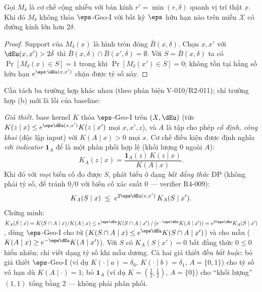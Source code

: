 \begin{menhde}
\label{prop:cap}
Gọi $M_\delta$ là cơ chế cộng nhiễu với bán kính $r' = \min(r, \delta)$ quanh vị
trí thật $x$. Khi đó $M_\delta$ không thỏa $\eps$-Geo-I với bất kỳ $\eps$ hữu hạn
nào trên miền $\mathcal{X}$ có đường kính lớn hơn $2\delta$.
\end{menhde}

\begin{proof}
Support của $M_\delta(x)$ là hình tròn đóng $\bar{B}(x, \delta)$. Chọn $x, x'$
với $\dEu(x, x') > 2\delta$ thì $\bar{B}(x,\delta) \cap \bar{B}(x',\delta) =
\emptyset$. Với $S = \bar{B}(x, \delta)$ ta có $\Pr[M_\delta(x) \in S] = 1$
trong khi $\Pr[M_\delta(x') \in S] = 0$; không tồn tại hằng số hữu hạn
$e^{\eps\, \dEu(x,x')}$ chặn được tỷ số này.
\end{proof}

Cần tách ba trường hợp khác nhau (theo phản biện V-010/R2-011); chỉ trường hợp
(b) mới là lỗi của baseline:

\begin{menhde}
\label{prop:fixedaccept}
\emph{Giả thiết.} base kernel $K$ thỏa $\eps$-Geo-I trên $(X,\dEu)$ (tức
$K(z\mid x)\le e^{\eps\dEu(x,x')}K(z\mid x')$ mọi $x,x',z$), và $A$ là tập cho
phép \emph{cố định, công khai} (độc lập input) với $K(A\mid x)>0$ mọi $x$.
Cơ chế điều kiện được định nghĩa \emph{với indicator} $\mathbf 1_A$ để là một
phân phối hợp lệ (khối lượng $0$ ngoài $A$):
\[
K_A(z\mid x)=\frac{\mathbf 1_A(z)\,K(z\mid x)}{K(A\mid x)} .
\]
Khi đó với \emph{mọi} biến cố đo được $S$, phát biểu ở dạng \emph{bất đẳng thức}
DP (không phải tỷ số, để tránh $0/0$ với biến cố xác suất 0 --- verifier R4-009):
\[
K_A(S\mid x)\;\le\;e^{2\eps \dEu(x,x')}\,K_A(S\mid x').
\]
Chứng minh: $K_A(S\mid x)=K(S\cap A\mid x)/K(A\mid x)
\le e^{\eps \dEu}K(S\cap A\mid x')\,/\,(e^{-\eps \dEu}K(A\mid x'))
=e^{2\eps \dEu}K_A(S\mid x')$, dùng $\eps$-Geo-I cho tử ($K(S\cap A\mid x)\le
e^{\eps\dEu}K(S\cap A\mid x')$) và cho mẫu ($K(A\mid x)\ge e^{-\eps\dEu}K(A\mid x')$).
Với $S$ có $K_A(S\mid x')=0$ bất đẳng thức $0\le 0$ hiển nhiên; chỉ viết dạng tỷ số
khi mẫu dương. Cả hai giả thiết đều \emph{bắt buộc}: bỏ giả thiết $\eps$-Geo-I (ví dụ
$K(\cdot\mid a)=\delta_0$, $K(\cdot\mid b)=\delta_1$, $A=\{0,1\}$) cho tỷ số vô
hạn dù $K(A\mid\cdot)=1$; bỏ $\mathbf 1_A$ (ví dụ $K=(\tfrac12,\tfrac12)$,
$A=\{0\}$) cho ``khối lượng'' $(1,1)$ tổng bằng $2$ --- không phải phân phối.
\end{menhde}

